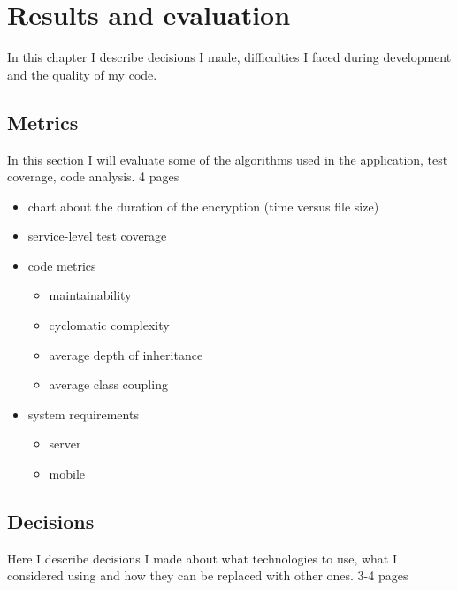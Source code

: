 \chapter{Results and evaluation}\label{ch:elemzes}
\begin{summary}
	In this chapter I describe decisions I made, difficulties I faced during development and the quality of my code.
\end{summary}


\section{Metrics}
In this section I will evaluate some of the algorithms used in the application, test coverage, code analysis. 4 pages

\begin{itemize}
	\item chart about the duration of the encryption (time versus file size)
	\item service-level test coverage
	\item code metrics
	\begin{itemize}
		\item maintainability
		\item cyclomatic complexity
		\item average depth of inheritance
		\item average class coupling
	\end{itemize}
	\item system requirements
	\begin{itemize}
		\item server
		\item mobile
	\end{itemize}
\end{itemize}

\section{Decisions}
Here I describe decisions I made about what technologies to use, what I considered using and how they can be replaced with other ones. 3-4 pages


